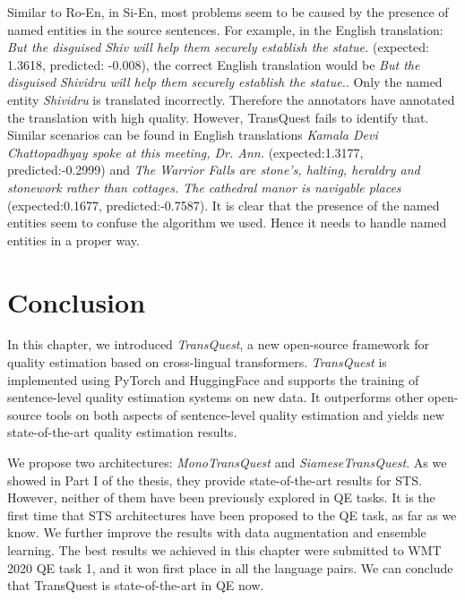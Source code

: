Similar to Ro-En, in Si-En, most problems seem to be caused by the presence of named entities in the source sentences. For example, in the English translation: \emph{But the disguised Shiv will help them securely establish the statue.
} (expected: 1.3618, predicted: -0.008), the correct English translation would be \emph{But the disguised Shividru will help them securely establish the statue.}. Only the named entity \emph{Shividru} is translated incorrectly. Therefore the annotators have annotated the translation with high quality. However, TransQuest fails to identify that. Similar scenarios can be found in English translations \emph{Kamala Devi Chattopadhyay spoke at this meeting, Dr. Ann.} (expected:1.3177, predicted:-0.2999) and \emph{The Warrior Falls are stone's, halting, heraldry and stonework rather than cottages. The cathedral manor is navigable places} (expected:0.1677, predicted:-0.7587). It is clear that the presence of the named entities seem to confuse the algorithm we used. Hence it needs to handle named entities in a proper way.


\section{Conclusion}
\label{sec:transquest_conclusion}
In this chapter, we introduced \textit{TransQuest}, a new open-source framework for quality estimation based on cross-lingual transformers. \textit{TransQuest} is implemented using PyTorch \autocite{NEURIPS2019_9015} and HuggingFace \autocite{wolf-etal-2020-transformers} and supports the training of sentence-level quality estimation systems on new data. It outperforms other open-source tools on both aspects of sentence-level quality estimation and yields new state-of-the-art quality estimation results.


We propose two architectures: \textit{MonoTransQuest} and \textit{SiameseTransQuest}. As we showed in Part I of the thesis, they provide state-of-the-art results for STS. However, neither of them have been previously explored in QE tasks. It is the first time that STS architectures have been proposed to the QE task, as far as we know. We further improve the results with data augmentation and ensemble learning. The best results we achieved in this chapter were submitted to WMT 2020 QE task 1, and it won first place in all the language pairs. We can conclude that TransQuest is state-of-the-art in QE now.

